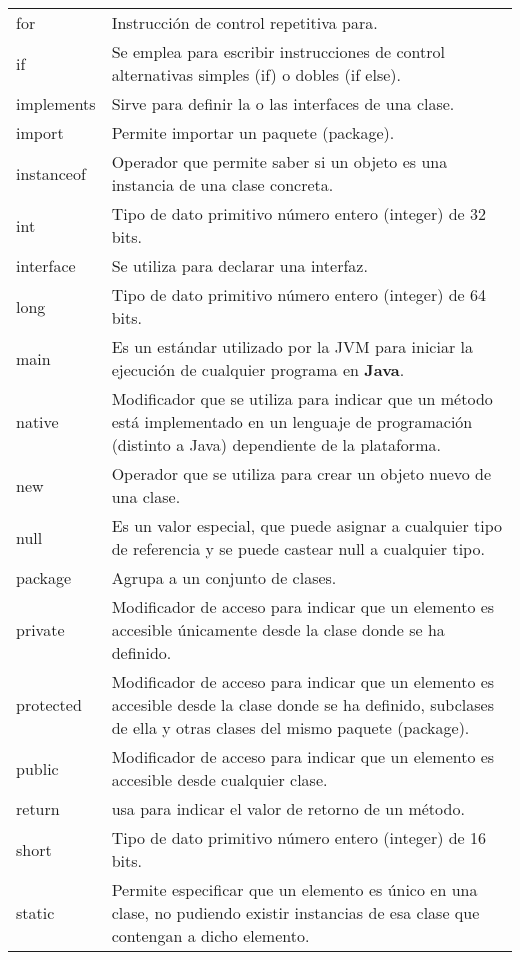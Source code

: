 \documentclass[12pt, A4]{article}
\begin{document}
{{{\begin{longtable}[h]{p{3cm} p{10cm}}
					\rowcolor{gray!20}	for	& Instrucción de control repetitiva para.\\
					if	& Se emplea para escribir instrucciones de control alternativas simples (if) o dobles (if else).\\
					\rowcolor{gray!20}	implements	& Sirve para definir la o las interfaces de una clase.\\
					import	& Permite importar un paquete (package).\\
					\rowcolor{gray!20}	instanceof	& Operador que permite saber si un objeto es una instancia de una clase concreta.\\
					int	& Tipo de dato primitivo número entero (integer) de 32 bits.\\
					\rowcolor{gray!20}	interface	& Se utiliza para declarar una interfaz.\\
					long	& Tipo de dato primitivo número entero (integer) de 64 bits.\\
					\rowcolor{gray!20}	main	& Es un est\'andar utilizado por la JVM para iniciar la ejecuci\'on de  cualquier programa en \textbf{Java}.\\
					native	& Modificador que se utiliza para indicar que un método está implementado en un lenguaje de programación (distinto a Java) dependiente de la plataforma.\\
					\rowcolor{gray!20}	new	& Operador que se utiliza para crear un objeto nuevo de una clase.\\
					null & Es un valor especial, que puede asignar a cualquier tipo de referencia y se puede castear null a cualquier tipo.\\
					\rowcolor{gray!20}	package	& Agrupa a un conjunto de clases.\\
					private	& Modificador de acceso para indicar que un elemento es accesible únicamente desde la clase donde se ha definido.\\
					\rowcolor{gray!20}	protected	& Modificador de acceso para indicar que un elemento es accesible desde la clase donde se ha definido, subclases de ella y otras clases del mismo paquete (package).\\
					public	& Modificador de acceso para indicar que un elemento es accesible desde cualquier clase.\\
					\rowcolor{gray!20}	return	&  usa para indicar el valor de retorno de un método.\\
					short	& Tipo de dato primitivo número entero (integer) de 16 bits.\\
					\rowcolor{gray!20}	static	& Permite especificar que un elemento es único en una clase, no pudiendo existir instancias de esa clase que contengan a dicho elemento.\\

\end{longtable}}}}
\end{document}
